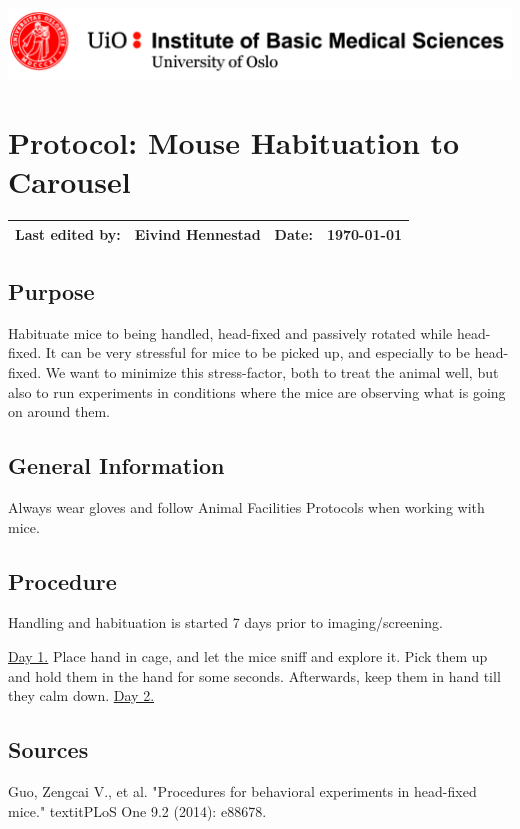 \newpage
{}
\thispagestyle{ft}

\hfill\includegraphics[width=0.8\linewidth]{imb_logo.png}

\section{Protocol:  Mouse Habituation to Carousel}

\vspace{3mm}
\begin{tabular*}{\linewidth}{| @{\extracolsep{\fill} } llll|}
\hline
Last edited by: & Eivind Hennestad & Date: & \today \\
\hline
\end{tabular*}

\subsection{Purpose}
Habituate mice to being handled, head-fixed and passively rotated while
head-fixed. It can be very stressful for mice to be picked up, and especially to
be head-fixed. We want to minimize this stress-factor, both to treat the animal
well, but also to run experiments in conditions where the mice are observing
what is going on around them.

\subsection{General Information}
Always wear gloves and follow Animal Facilities Protocols when working with mice.

\subsection{Procedure}
Handling and habituation is started 7 days prior to imaging/screening.

\underline{Day 1.} Place hand in cage, and let the mice sniff and explore it.
Pick them up and hold them in the hand for some seconds. Afterwards, keep them in hand till they calm down.
\underline{Day 2.}

\subsection{Sources}
Guo, Zengcai V., et al. "Procedures for behavioral experiments in head-fixed mice." textit{PLoS One} 9.2 (2014): e88678.
